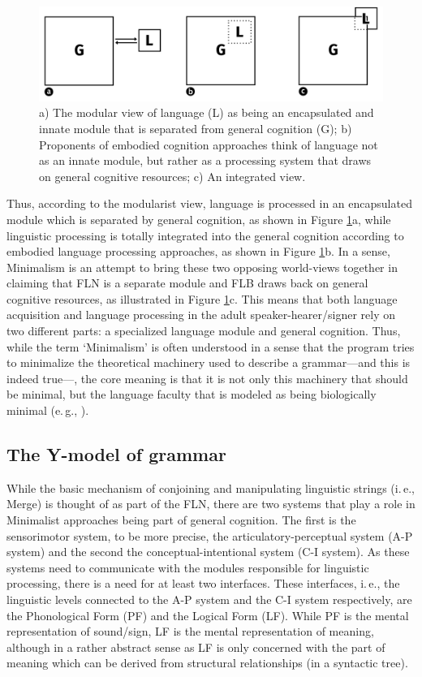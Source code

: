 \begin{figure}[bt]
\centering
	\includegraphics[width=1.0\textwidth]{model.jpg}
	\caption{a) The modular view of language (L) as being an encapsulated and innate module that is separated from general cognition (G); b) Proponents of embodied cognition approaches think of language not as an innate module, but rather as a processing system that draws on general cognitive resources; c) An integrated view.}
	\label{model}
\end{figure}

Thus, according to the modularist view, language is processed in an encapsulated module which is separated by general cognition, as shown in Figure \ref{model}a, while linguistic processing is totally integrated into the general cognition according to embodied language processing approaches, as shown in Figure \ref{model}b.  In a sense, Minimalism is an attempt to bring these two opposing world-views together in claiming that FLN is a separate module and FLB draws back on general cognitive resources, as illustrated in Figure \ref{model}c. This means that both language acquisition and language processing in the adult speaker-hearer/signer rely on two different parts: a specialized language module and general cognition. Thus, while the term `Minimalism' is often understood in a sense that the program tries to minimalize the theoretical machinery used to describe a grammar---and this is indeed true---, the core meaning is that it is not only this machinery that should be minimal, but the language faculty that is modeled as being biologically minimal (e.\,g., \citealt{sigurdsson2011uniformity}).

\subsection{The Y-model of grammar}
While the basic mechanism of conjoining and manipulating linguistic strings (i.\,e., Merge) is thought of as part of the FLN, there are two systems that play a role in Minimalist approaches being part of general cognition. The first is the sensorimotor system, to be more precise, the articulatory-perceptual system (A-P system) and the second the conceptual-intentional system (C-I system). As these systems need to communicate with the modules responsible for linguistic processing, there is a need for at least two interfaces. These interfaces, i.\,e., the linguistic levels connected to the A-P system and the C-I system respectively, are the Phonological Form (PF) and the Logical Form (LF). While PF is the mental representation of sound/sign, LF is the mental representation of meaning, although in a rather abstract sense as LF is only concerned with the part of meaning which can be derived from structural relationships (in a syntactic tree).
 
